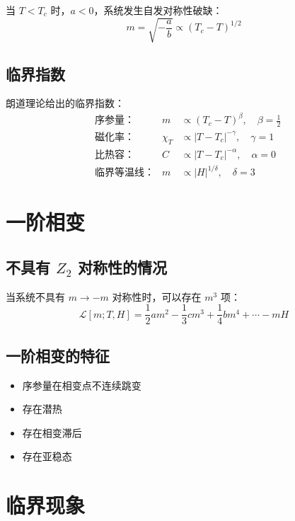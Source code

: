 \documentclass[12pt,a4paper]{ctexart}
\begin{document}
当 $T < T_c$ 时，$a < 0$，系统发生自发对称性破缺：
\begin{equation}
    m = \sqrt{-\frac{a}{b}} \propto (T_c - T)^{1/2}
\end{equation}

\subsection{临界指数}

朗道理论给出的临界指数：
\begin{align}
    &\text{序参量：} & m &\propto (T_c - T)^{\beta}, \quad \beta = \frac{1}{2} \\
    &\text{磁化率：} & \chi_T &\propto |T - T_c|^{-\gamma}, \quad \gamma = 1 \\
    &\text{比热容：} & C &\propto |T - T_c|^{-\alpha}, \quad \alpha = 0 \\
    &\text{临界等温线：} & m &\propto |H|^{1/\delta}, \quad \delta = 3
\end{align}

\section{一阶相变}

\subsection{不具有 $Z_2$ 对称性的情况}

当系统不具有 $m \to -m$ 对称性时，可以存在 $m^3$ 项：
\begin{equation}
    \mathcal{L}[m; T, H] = \frac{1}{2} a m^2 - \frac{1}{3} c m^3 + \frac{1}{4} b m^4 + \cdots - m H
\end{equation}

\subsection{一阶相变的特征}

\begin{itemize}
    \item 序参量在相变点不连续跳变
    \item 存在潜热
    \item 存在相变滞后
    \item 存在亚稳态
\end{itemize}

\section{临界现象}
\end{document}
